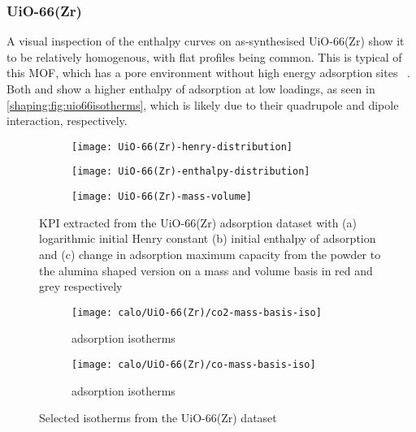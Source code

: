 
\subsubsection{UiO-66(Zr)}

A visual inspection of the enthalpy curves on as-synthesised UiO-66(Zr)
show it to be relatively homogenous, with flat
profiles being common. This is typical of this MOF, which has
a pore environment without high energy adsorption sites
~\cite{wiersumEvaluationUiO66GasBased2011}.
Both  and  show a higher enthalpy of adsorption
at low loadings, as seen in \autoref{shaping:fig:uio66isotherms},
which is likely due to their quadrupole and dipole interaction,
respectively.

\begin{figure}[p!]
	\centering
	\begin{subfigure}{\linewidth}
		\parbox[c]{0.1\linewidth}{\caption{}%
			\label{shaping:fig:analysisuio66henry}}%
		\parbox[b]{0.8\linewidth}{%
			\texttt{[image: UiO-66(Zr)-henry-distribution]}%
		}%
	\end{subfigure}%

	\begin{subfigure}{\linewidth}
		\parbox[c]{0.1\linewidth}{\caption{}%
			\label{shaping:fig:analysisuio66enth}}%
		\parbox[b]{0.8\linewidth}{%
			\texttt{[image: UiO-66(Zr)-enthalpy-distribution]}%
		}%
	\end{subfigure}%

	\begin{subfigure}{\linewidth}
		\parbox[c]{0.1\linewidth}{\caption{}%
			\label{shaping:fig:analysisuio66basis}}%
		\parbox[b]{0.8\linewidth}{%
			\texttt{[image: UiO-66(Zr)-mass-volume]}%
		}%
	\end{subfigure}%

	\caption{\gls{KPI} extracted from the UiO-66(Zr) adsorption dataset with
		(a) logarithmic initial Henry constant (b) initial enthalpy of
        adsorption and (c) change in adsorption maximum capacity from 
        the powder to the alumina shaped version on a mass and volume 
        basis in red and grey respectively}%
	\label{shaping:fig:analysisuio66}
\end{figure}

\begin{figure}[htb]
	\centering
	\begin{subfigure}{0.45\textwidth}
		\texttt{[image: calo/UiO-66(Zr)/co2-mass-basis-iso]}
		\caption{ adsorption isotherms}%
		\label{shaping:fig:uio66co2ads}
	\end{subfigure}%
	\begin{subfigure}{0.45\textwidth}
		\texttt{[image: calo/UiO-66(Zr)/co-mass-basis-iso]}
		\caption{ adsorption isotherms}%
		\label{shaping:fig:uio66coads}
	\end{subfigure}%
	\caption{Selected isotherms from the UiO-66(Zr) dataset}%
	\label{shaping:fig:uio66isotherms}
\end{figure}

